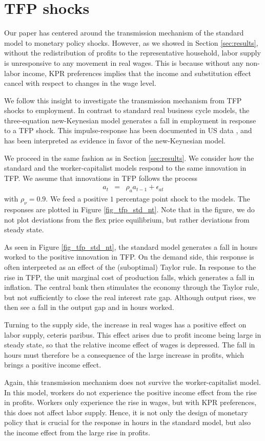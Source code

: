 \section{TFP shocks}
\label{sec:tfp}

Our paper has centered around the transmission mechanism of the standard model to monetary policy shocks. However, as we showed in Section \ref{sec:results}, without the redistribution of profits to the representative household, labor supply is unresponsive to any movement in real wages. This is because without any non-labor income, KPR preferences implies that the income and substitution effect cancel with respect to changes in the wage level. 

We follow this insight to investigate the transmission mechanism from TFP shocks to employment. In contrast to standard real business cycle models, the three-equation new-Keynesian model generates a fall in employment in response to a TFP shock. This impulse-response has been documented in US data \citep{Gali1999,Gali2004,Francis2005,Basu2006}, and has been interpreted as evidence in favor of the new-Keynesian model. 

We proceed in the same fashion as in Section \ref{sec:results}. We consider how the standard and the worker-capitalist models respond to the same innovation in TFP. We assume that innovations in TFP follows the process
\begin{eqnarray}
a_t &=& \rho_{a} a_{t-1}+\epsilon_{a t} \nonumber
\end{eqnarray}
with $\rho_{\nu}=0.9$. We feed a positive $1$ percentage point shock to the models. The responses are plotted in Figure \ref{fig_tfp_std_nt}. Note that in the figure, we do not plot deviations from the flex price equilibrium, but rather deviations from steady state.

As seen in Figure \ref{fig_tfp_std_nt}, the standard model generates a fall in hours worked to the positive innovation in TFP. On the demand side, this response is often interpreted as an effect of the (suboptimal) Taylor rule. In response to the rise in TFP, the unit marginal cost of production falls, which generates a fall in inflation. The central bank then stimulates the economy through the Taylor rule, but not sufficiently to close the real interest rate gap. Although output rises, we then see a fall in the output gap and in hours worked. 

Turning to the supply side, the increase in real wages has a positive effect on labor supply, ceteris paribus. This effect arises due to profit income being large in steady state, so that the relative income effect of wages is depressed. The fall in hours must therefore be a consequence of the large increase in profits, which brings a positive income effect. 

Again, this transmission mechanism does not survive the worker-capitalist model. In this model, workers do not experience the positive income effect from the rise in profits. Workers only experience the rise in wages, but with KPR preferences, this does not affect labor supply. Hence, it is not only the design of monetary policy that is crucial for the response in hours in the standard model, but also the income effect from the large rise in profits.
